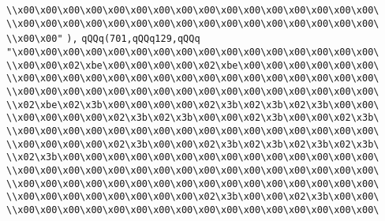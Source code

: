 \verb|\\x00\x00\x00\x00\x00\x00\x00\x00\x00\x00\x00\x00\x00\x00\x00\x00\|\newline
\verb|\\x00\x00\x00\x00\x00\x00\x00\x00\x00\x00\x00\x00\x00\x00\x00\x00\|\newline
\verb|\\x00\x00"|\newline
\verb|),|\newline
\verb|qQQq(701,qQQq129,qQQq|\newline
\verb|"\x00\x00\x00\x00\x00\x00\x00\x00\x00\x00\x00\x00\x00\x00\x00\x00\|\newline
\verb|\\x00\x00\x02\xbe\x00\x00\x00\x00\x02\xbe\x00\x00\x00\x00\x00\x00\|\newline
\verb|\\x00\x00\x00\x00\x00\x00\x00\x00\x00\x00\x00\x00\x00\x00\x00\x00\|\newline
\verb|\\x00\x00\x00\x00\x00\x00\x00\x00\x00\x00\x00\x00\x00\x00\x00\x00\|\newline
\verb|\\x02\xbe\x02\x3b\x00\x00\x00\x00\x02\x3b\x02\x3b\x02\x3b\x00\x00\|\newline
\verb|\\x00\x00\x00\x00\x02\x3b\x02\x3b\x00\x00\x02\x3b\x00\x00\x02\x3b\|\newline
\verb|\\x00\x00\x00\x00\x00\x00\x00\x00\x00\x00\x00\x00\x00\x00\x00\x00\|\newline
\verb|\\x00\x00\x00\x00\x02\x3b\x00\x00\x02\x3b\x02\x3b\x02\x3b\x02\x3b\|\newline
\verb|\\x02\x3b\x00\x00\x00\x00\x00\x00\x00\x00\x00\x00\x00\x00\x00\x00\|\newline
\verb|\\x00\x00\x00\x00\x00\x00\x00\x00\x00\x00\x00\x00\x00\x00\x00\x00\|\newline
\verb|\\x00\x00\x00\x00\x00\x00\x00\x00\x00\x00\x00\x00\x00\x00\x00\x00\|\newline
\verb|\\x00\x00\x00\x00\x00\x00\x00\x00\x02\x3b\x00\x00\x02\x3b\x00\x00\|\newline
\verb|\\x00\x00\x00\x00\x00\x00\x00\x00\x00\x00\x00\x00\x00\x00\x00\x00\|\newline
